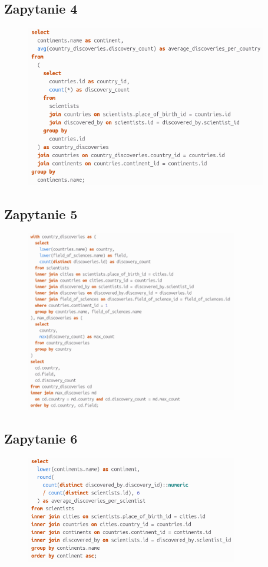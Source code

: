\documentclass[11pt]{article}
\begin{document}
	\subsection{Zapytanie 4}
		\begin{figure}[!ht]
			\begin{center}
				\includegraphics[width=400px]{s4.png}
			\end{center}
		\end{figure}

\newpage
	\subsection{Zapytanie 5}
		\begin{figure}[!ht]
			\begin{center}
				\includegraphics[width=350px]{s5.png}
			\end{center}
		\end{figure}
	\subsection{Zapytanie 6}
		\begin{figure}[!ht]
			\begin{center}
				\includegraphics[width=350px]{s6.png}
			\end{center}
		\end{figure}
\end{document}
